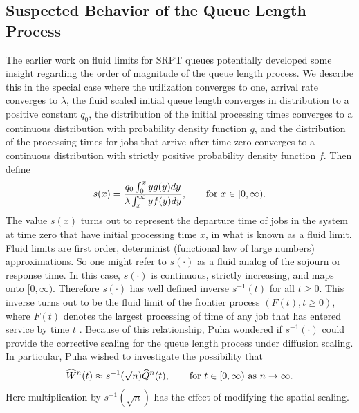 \documentclass[12pt]{article}
\theoremstyle{plain}
\theoremstyle{definition}
\theoremstyle{remark}
\begin{document}
\subsection{Suspected Behavior of the Queue Length Process}
The earlier work \cite{dow09} on fluid limits for SRPT queues potentially developed some insight regarding the order of magnitude of the queue length process.
We describe this in the special case where the utilization converges to one, arrival rate converges to $\lambda$, the
fluid scaled initial queue length converges in distribution to a positive constant $q_0$, the distribution of the initial processing
times converges to a continuous distribution with probability density function $g$, and the distribution of the processing times for jobs that
arrive after time zero converges to a continuous distribution with strictly positive probability density function $f$.  Then define
$$
s(x)=\frac{ q_0\int_0^x y g(y) dy }{\lambda\int_x^{\infty} y f(y) dy},\qquad\hbox{for }x\in[0,\infty).
$$
The value $s(x)$ turns out to represent the departure time of jobs in the system at time zero that have initial processing
time $x$, in what is known as a fluid limit.  Fluid limits are first order, determinist (functional law of large numbers) approximations.  So one might refer to $s(\cdot)$ as a fluid analog of the sojourn or response time.
In this case, $s(\cdot)$ is continuous,
strictly increasing, and maps onto $[0,\infty)$.  Therefore $s(\cdot)$ has well defined inverse $s^{-1}(t)$ for all $t\ge 0$.
This inverse turns out to be the fluid limit of the frontier process $(F(t),t\ge 0)$, where $F(t)$ denotes the largest
processing of time of any job that has entered service by time $t$ \cite[Theorem 5.20]{dow09}.  Because of this relationship, Puha wondered if $s^{-1}(\cdot)$
could provide the corrective scaling for the queue length process under diffusion scaling.  In particular, Puha wished to investigate
the possibility that
\begin{equation}\label{eq:main}
\widehat W^n(t) \approx s^{-1}(\sqrt{n}) \widehat Q^n(t),\qquad\hbox{for } t\in[0,\infty)\hbox{ as }n\to\infty.
\end{equation}
Here multiplication by $s^{-1}(\sqrt{n})$ has the effect of modifying the spatial scaling.
\end{document}
